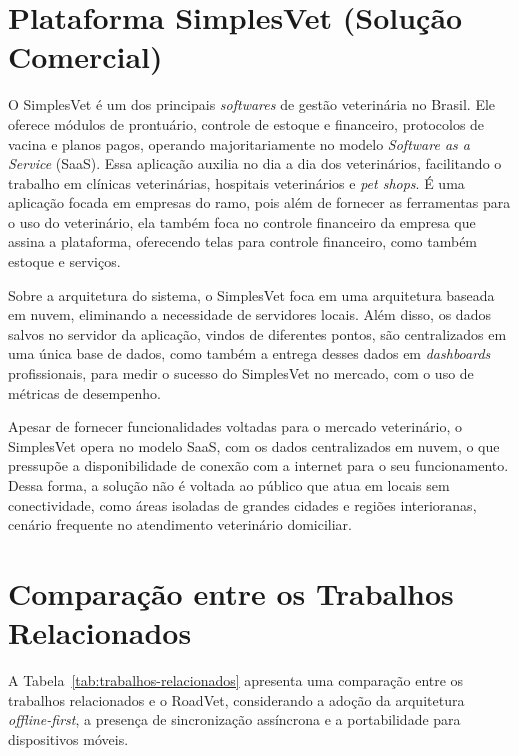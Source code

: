 \section{Plataforma SimplesVet (Solução Comercial)}
\label{sec:trabalho-relacionado-b}
O SimplesVet \cite{simplesvet} é um dos principais \textit{softwares} de gestão veterinária no Brasil. Ele oferece módulos de prontuário, controle de estoque e financeiro, protocolos de vacina e planos pagos, operando majoritariamente no modelo \textit{Software as a Service} (SaaS). Essa aplicação auxilia no dia a dia dos veterinários, facilitando o trabalho em clínicas veterinárias, hospitais veterinários e \textit{pet shops}. É uma aplicação focada em empresas do ramo, pois além de fornecer as ferramentas para o uso do veterinário, ela também foca no controle financeiro da empresa que assina a plataforma, oferecendo telas para controle financeiro, como também estoque e serviços. 

Sobre a arquitetura do sistema, o SimplesVet foca em uma arquitetura baseada em nuvem, eliminando a necessidade de servidores locais. Além disso, os dados salvos no servidor da aplicação, vindos de diferentes pontos, são centralizados em uma única base de dados, como também a entrega desses dados em \textit{dashboards} profissionais, para medir o sucesso do SimplesVet no mercado, com o uso de métricas de desempenho.

Apesar de fornecer funcionalidades voltadas para o mercado veterinário, o SimplesVet opera no modelo SaaS, com os dados centralizados em nuvem, o que pressupõe a disponibilidade de conexão com a internet para o seu funcionamento. Dessa forma, a solução não é voltada ao público que atua em locais sem conectividade, como áreas isoladas de grandes cidades e regiões interioranas, cenário frequente no atendimento veterinário domiciliar. 



    

\section{Comparação entre os Trabalhos Relacionados}
\label{sec:trabalhos-relacionados-comparacao}
A Tabela~\ref{tab:trabalhos-relacionados} apresenta uma comparação entre os trabalhos relacionados e o RoadVet, considerando a adoção da arquitetura \textit{offline-first}, a presença de sincronização assíncrona e a portabilidade para dispositivos móveis.

